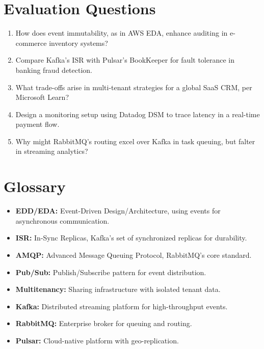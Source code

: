 \documentclass[12pt,a4paper]{report}
\begin{document}
\chapter*{Evaluation Questions}
\begin{enumerate}
    \item How does event immutability, as in AWS EDA, enhance auditing in e-commerce inventory systems?
    \item Compare Kafka's ISR with Pulsar's BookKeeper for fault tolerance in banking fraud detection.
    \item What trade-offs arise in multi-tenant strategies for a global SaaS CRM, per Microsoft Learn?
    \item Design a monitoring setup using Datadog DSM to trace latency in a real-time payment flow.
    \item Why might RabbitMQ's routing excel over Kafka in task queuing, but falter in streaming analytics?
\end{enumerate}

\chapter*{Glossary}
\begin{itemize}
    \item \textbf{EDD/EDA:} Event-Driven Design/Architecture, using events for asynchronous communication.
    \item \textbf{ISR:} In-Sync Replicas, Kafka's set of synchronized replicas for durability.
    \item \textbf{AMQP:} Advanced Message Queuing Protocol, RabbitMQ's core standard.
    \item \textbf{Pub/Sub:} Publish/Subscribe pattern for event distribution.
    \item \textbf{Multitenancy:} Sharing infrastructure with isolated tenant data.
    \item \textbf{Kafka:} Distributed streaming platform for high-throughput events.
    \item \textbf{RabbitMQ:} Enterprise broker for queuing and routing.
    \item \textbf{Pulsar:} Cloud-native platform with geo-replication.
\end{itemize}
\end{document}
